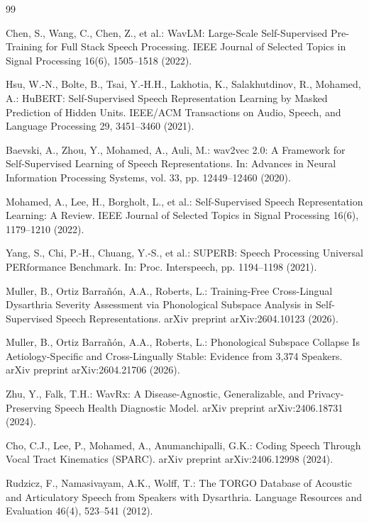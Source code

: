\documentclass[runningheads]{llncs}
\begin{document}
\begin{thebibliography}{99}

Chen, S., Wang, C., Chen, Z., et al.: WavLM: Large-Scale Self-Supervised Pre-Training for
Full Stack Speech Processing. IEEE Journal of Selected Topics in Signal Processing 16(6),
1505--1518 (2022).

Hsu, W.-N., Bolte, B., Tsai, Y.-H.H., Lakhotia, K., Salakhutdinov, R., Mohamed, A.:
HuBERT: Self-Supervised Speech Representation Learning by Masked Prediction of Hidden
Units. IEEE/ACM Transactions on Audio, Speech, and Language Processing 29, 3451--3460
(2021).

Baevski, A., Zhou, Y., Mohamed, A., Auli, M.: wav2vec 2.0: A Framework for Self-Supervised
Learning of Speech Representations. In: Advances in Neural Information Processing Systems,
vol. 33, pp. 12449--12460 (2020).

Mohamed, A., Lee, H., Borgholt, L., et al.: Self-Supervised Speech Representation Learning:
A Review. IEEE Journal of Selected Topics in Signal Processing 16(6), 1179--1210 (2022).

Yang, S., Chi, P.-H., Chuang, Y.-S., et al.: SUPERB: Speech Processing Universal
PERformance Benchmark. In: Proc. Interspeech, pp. 1194--1198 (2021).

Muller, B., Ortiz Barra\~n\'on, A.A., Roberts, L.: Training-Free Cross-Lingual Dysarthria
Severity Assessment via Phonological Subspace Analysis in Self-Supervised Speech
Representations. arXiv preprint arXiv:2604.10123 (2026).

Muller, B., Ortiz Barra\~n\'on, A.A., Roberts, L.: Phonological Subspace Collapse Is
Aetiology-Specific and Cross-Lingually Stable: Evidence from 3,374 Speakers. arXiv preprint
arXiv:2604.21706 (2026).

Zhu, Y., Falk, T.H.: WavRx: A Disease-Agnostic, Generalizable, and Privacy-Preserving
Speech Health Diagnostic Model. arXiv preprint arXiv:2406.18731 (2024).

Cho, C.J., Lee, P., Mohamed, A., Anumanchipalli, G.K.: Coding Speech Through Vocal Tract
Kinematics (SPARC). arXiv preprint arXiv:2406.12998 (2024).

Rudzicz, F., Namasivayam, A.K., Wolff, T.: The TORGO Database of Acoustic and Articulatory
Speech from Speakers with Dysarthria. Language Resources and Evaluation 46(4), 523--541
(2012).


\end{thebibliography}
\end{document}
